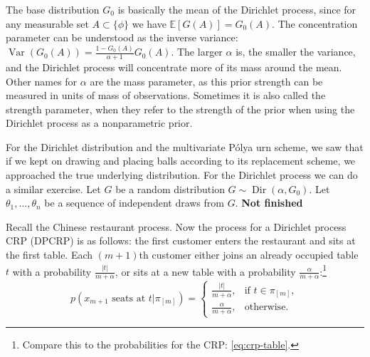 The base distribution $G_0$ is basically the mean of the Dirichlet process, since for any measurable set $A\subset\{\phi\}$ we have $\mathbb{E}[G(A)]=G_0(A)$. The concentration parameter can be understood as the inverse variance: $\operatorname{Var}(G_0(A))= \frac{1-G_0(A)}{\alpha +1 }G_0(A)$. The larger $\alpha$ is, the smaller the variance, and the Dirichlet process will concentrate more of its mass around the mean. Other names for $\alpha$ are the mass parameter, as this prior strength can be measured in units of mass of observations. Sometimes it is also called the strength parameter, when they refer to the strength of the prior when using the Dirichlet process as a nonparametric prior.

For the Dirichlet distribution and the multivariate P\'olya urn scheme, we saw that if we kept on drawing and placing balls according to its replacement scheme, we approached the true underlying distribution. For the Dirichlet process we can do a similar exercise. Let $G$ be a random distribution $G\sim\operatorname{Dir}(\alpha, G_0)$. Let $\theta_1,\ldots,\theta_n$ be a sequence of independent draws from $G$. 
\textbf{Not finished}


Recall the Chinese restaurant process. Now the process for a Dirichlet process CRP (DPCRP) is as follows: the first customer enters the restaurant and sits at the first table. Each $(m+1)$th customer either joins an already occupied table $t$ with a probability $\frac{|t|}{m+\alpha}$, or sits at a new table with a probability $\frac{\alpha}{m+\alpha}$:\footnote{Compare this to the probabilities for the CRP: \cref{eq:crp-table}.}
\begin{equation}\label{eq:dpcrp-table}
	p(x_{m+1}\text{ seats at }t|\pi_{[m]}) = 
    \begin{cases}
    	\frac{|t|}{m+\alpha}, & \text{if }t\in\pi_{[m]},\\
    	\frac{\alpha}{m+\alpha}, & \text{otherwise}.
  	\end{cases}
\end{equation}

